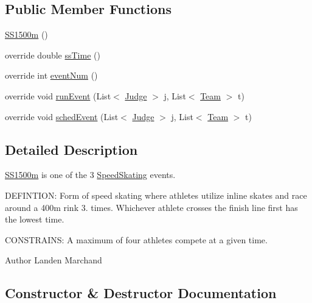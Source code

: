 \subsection*{Public Member Functions}
\begin{DoxyCompactItemize}
\item 
\hyperlink{classProject__Codename__Olympia__v1_1_1__0_1_1SS1500m_a86936a68b36ff296c67b067a73ed90bd}{S\+S1500m} ()
\item 
override double \hyperlink{classProject__Codename__Olympia__v1_1_1__0_1_1SS1500m_a70484e4f6b73c271756fa9bb6950eb0b}{ss\+Time} ()
\item 
override int \hyperlink{classProject__Codename__Olympia__v1_1_1__0_1_1SS1500m_a012967ff7e84eb9d1578705ad465aecc}{event\+Num} ()
\item 
override void \hyperlink{classProject__Codename__Olympia__v1_1_1__0_1_1SS1500m_a749ab5adb7bd98da6e7370fef95d46fd}{run\+Event} (List$<$ \hyperlink{classProject__Codename__Olympia__v1_1_1__0_1_1Judge}{Judge} $>$ j, List$<$ \hyperlink{classProject__Codename__Olympia__v1_1_1__0_1_1Team}{Team} $>$ t)
\item 
override void \hyperlink{classProject__Codename__Olympia__v1_1_1__0_1_1SS1500m_af87bf024ce84968289b999323d1a53bb}{sched\+Event} (List$<$ \hyperlink{classProject__Codename__Olympia__v1_1_1__0_1_1Judge}{Judge} $>$ j, List$<$ \hyperlink{classProject__Codename__Olympia__v1_1_1__0_1_1Team}{Team} $>$ t)
\end{DoxyCompactItemize}


\subsection{Detailed Description}
\hyperlink{classProject__Codename__Olympia__v1_1_1__0_1_1SS1500m}{S\+S1500m} is one of the 3 \hyperlink{classProject__Codename__Olympia__v1_1_1__0_1_1SpeedSkating}{Speed\+Skating} events. 

D\+E\+F\+I\+N\+T\+I\+ON\+: Form of speed skating where athletes utilize inline skates and race around a 400m rink 3. times. Whichever athlete crosses the finish line first has the lowest time.

C\+O\+N\+S\+T\+R\+A\+I\+NS\+: A maximum of four athletes compete at a given time.\begin{DoxyAuthor}{Author}
Landen Marchand 
\end{DoxyAuthor}


\subsection{Constructor \& Destructor Documentation}
\mbox{\label{classProject__Codename__Olympia__v1_1_1__0_1_1SS1500m_a86936a68b36ff296c67b067a73ed90bd}} 
